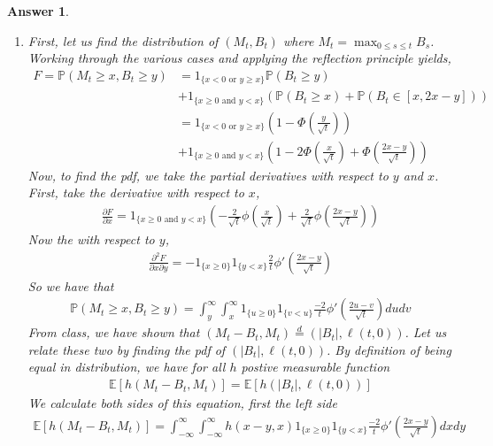 \documentclass[12pt]{article}
\theoremstyle{colon}
\newtheorem*{answer}{Answer}
\begin{document}
\begin{answer}
\begin{enumerate}[label=\alph*)]
    \item First, let us find the distribution of $(M_t, B_t)$ where $M_t = \max_{0 \leq s \leq t} B_s$. Working through the various cases and applying the reflection principle yields,
      \begin{align*}
        F = \mathbb{P}(M_t \geq x, B_t \geq y) &= 1_{\{x < 0 \text{ or } y \geq x\}} \mathbb{P}(B_t \geq y) \\
        &+ 1_{\{x \geq 0 \text{ and } y < x\}} (\mathbb{P}(B_t \geq x) + \mathbb{P}(B_t \in [x, 2x-y])) \\
        &= 1_{\{x < 0 \text{ or } y \geq x\}} (1 - \Phi(\frac{y}{\sqrt{t}})) \\
        &+ 1_{\{x \geq 0 \text{ and } y < x\}} (1 - 2 \Phi(\frac{x}{\sqrt{t}}) + \Phi(\frac{2x - y}{\sqrt{t}}))
      \end{align*}
      Now, to find the pdf, we take the partial derivatives with respect to $y$ and $x$. First, take the derivative with respect to $x$,
      \begin{gather*}
        \frac{\partial F}{\partial x} = 1_{\{x \geq 0 \text{ and } y < x\}} (-\frac{2}{\sqrt{t}} \phi(\frac{x}{\sqrt{t}}) + \frac{2}{\sqrt{t}}\phi(\frac{2x - y}{\sqrt{t}}))
      \end{gather*}
      Now the with respect to $y$,
      \begin{gather*}
        \frac{\partial^2 F}{\partial x \partial y} = -1_{\{x \geq 0\}} 1_{\{y < x\}} \frac{2}{t}\phi'(\frac{2x - y}{\sqrt{t}})
      \end{gather*}
      So we have that
      \begin{gather*}
        \mathbb{P}(M_t \geq x, B_t \geq y) = \int_y^\infty \int_x^\infty 1_{\{u \geq 0\}} 1_{\{v < u\}} \frac{-2}{t}\phi'(\frac{2u - v}{\sqrt{t}}) du dv
      \end{gather*}
      From class, we have shown that $(M_t - B_t, M_t) \stackrel{d}{=} (\lvert B_t \rvert, \ell(t,0))$. Let us relate these two by finding the pdf of $(\lvert B_t \rvert, \ell(t,0))$. By definition of being equal in distribution, we have for all $h$ postive measurable function
      \begin{gather*}
        \mathbb{E}[h(M_t - B_t, M_t)] = \mathbb{E}[h(\lvert B_t \rvert, \ell(t,0))]
      \end{gather*}
      We calculate both sides of this equation, first the left side
      \begin{gather*}
        \mathbb{E}[h(M_t - B_t, M_t)] = \int_{-\infty}^\infty \int_{-\infty}^\infty h(x-y, x) 1_{\{x \geq 0\}} 1_{\{y < x\}} \frac{-2}{t}\phi'(\frac{2x - y}{\sqrt{t}}) dx dy

\end{gather*}
\end{enumerate}
\end{answer}
\end{document}
